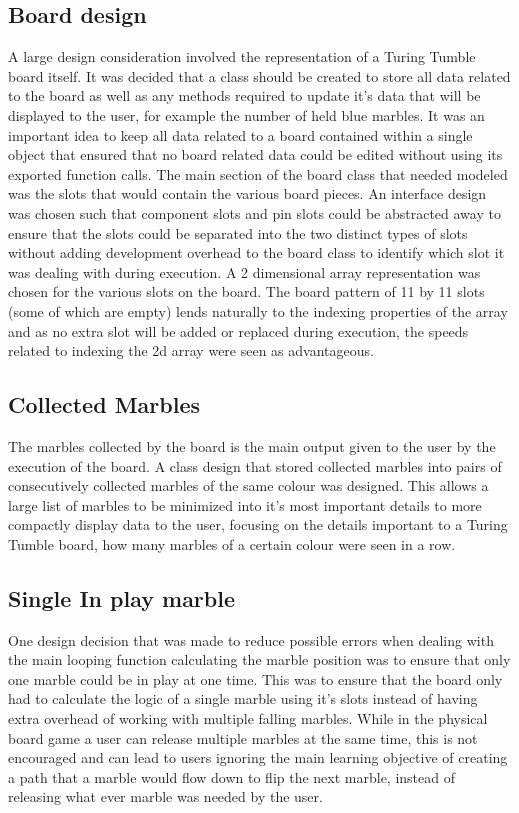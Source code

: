 \documentclass{l4proj}
\begin{document}
\subsection{Board design}
A large design consideration involved the representation of a Turing Tumble board itself. It was decided that a class should be created to store all data related to the board as well as any methods required to update it's data that will be displayed to the user, for example the number of held blue marbles. It was an important idea to keep all data related to a board contained within a single object that ensured that no board related data could be edited without using its exported function calls. The main section of the board class that needed modeled was the slots that would contain the various board pieces. An interface design was chosen such that component slots and pin slots could be abstracted away to ensure that the slots could be separated into the two distinct types of slots without adding development overhead to the board class to identify which slot it was dealing with during execution. A 2 dimensional array representation was chosen for the various slots on the board. The board pattern of 11 by 11 slots (some of which are empty) lends naturally to the indexing properties of the array and as no extra slot will be added or replaced during execution, the speeds related to indexing the 2d array were seen as advantageous. 

\subsection{Collected Marbles}
The marbles collected by the board is the main output given to the user by the execution of the board. A class design that stored collected marbles into pairs of consecutively collected marbles of the same colour was designed. This allows a large list of marbles to be minimized into it's most important details to more compactly display data to the user, focusing on the details important to a Turing Tumble board, how many marbles of a certain colour were seen in a row. 

\subsection{Single In play marble}
One design decision that was made to reduce possible errors when dealing with the main looping function calculating the marble position was to ensure that only one marble could be in play at one time. This was to ensure that the board only had to calculate the logic of a single marble using it's slots instead of having extra overhead of working with multiple falling marbles. While in the physical board game a user can release multiple marbles at the same time, this is not encouraged and can lead to users ignoring the main learning objective of creating a path that a marble would flow down to flip the next marble, instead of releasing what ever marble was needed by the user.
\end{document}
